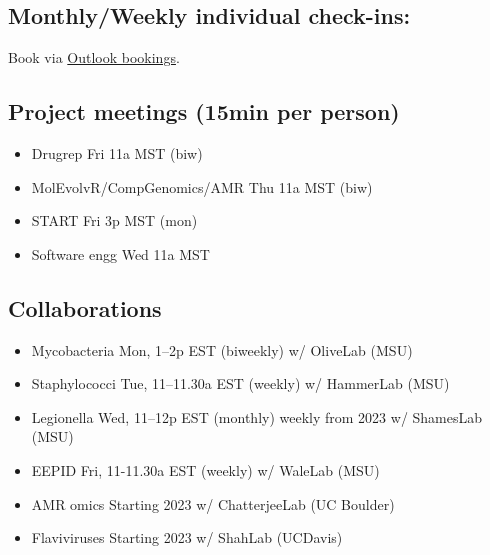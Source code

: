 \documentclass[
  letterpaper,
  DIV=11,
  numbers=noendperiod]{scrreprt}
\providecommand{\tightlist}{%
  \setlength{\itemsep}{0pt}\setlength{\parskip}{0pt}}\usepackage{longtable,booktabs,array}
\begin{document}
\hypertarget{monthlyweekly-individual-check-ins}{%
\subsection{Monthly/Weekly individual
check-ins:}\label{monthlyweekly-individual-check-ins}}

Book via \href{https://bit.ly/janani-cucal}{Outlook bookings}.

\hypertarget{project-meetings-15min-per-person}{%
\subsection{Project meetings (15min per
person)}\label{project-meetings-15min-per-person}}

\begin{itemize}
\tightlist
\item
  Drugrep \textbar{} Fri 11a MST (biw)
\item
  MolEvolvR/CompGenomics/AMR \textbar{} Thu 11a MST (biw)
\item
  START \textbar{} Fri 3p MST (mon)
\item
  Software engg \textbar{} Wed 11a MST
\end{itemize}

\hypertarget{collaborations}{%
\subsection{Collaborations}\label{collaborations}}

\begin{itemize}
\tightlist
\item
  Mycobacteria \textbar{} Mon, 1--2p EST (biweekly) \textbar{} w/
  OliveLab (MSU)
\item
  Staphylococci \textbar{} Tue, 11--11.30a EST (weekly) \textbar{} w/
  HammerLab (MSU)
\item
  Legionella \textbar{} Wed, 11--12p EST (monthly) \textbar{} weekly
  from 2023 \textbar{} w/ ShamesLab (MSU)
\item
  EEPID \textbar{} Fri, 11-11.30a EST (weekly) \textbar{} w/ WaleLab
  (MSU)
\item
  AMR omics \textbar{} Starting 2023 \textbar{} w/ ChatterjeeLab (UC
  Boulder)
\item
  Flaviviruses \textbar{} Starting 2023 \textbar{} w/ ShahLab (UCDavis)
\end{itemize}

\end{document}
